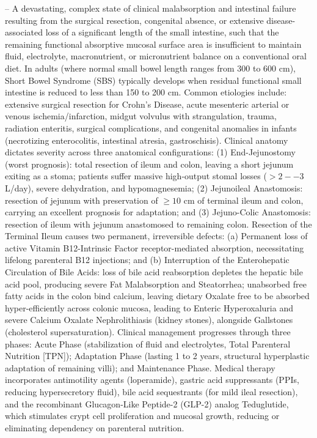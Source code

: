 -- A devastating, complex state of clinical malabsorption and intestinal failure resulting from the surgical resection, congenital absence, or extensive disease-associated loss of a significant length of the small intestine, such that the remaining functional absorptive mucosal surface area is insufficient to maintain fluid, electrolyte, macronutrient, or micronutrient balance on a conventional oral diet. In adults (where normal small bowel length ranges from 300 to 600 cm), Short Bowel Syndrome (SBS) typically develops when residual functional small intestine is reduced to less than 150 to 200 cm. Common etiologies include: extensive surgical resection for Crohn's Disease, acute mesenteric arterial or venous ischemia/infarction, midgut volvulus with strangulation, trauma, radiation enteritis, surgical complications, and congenital anomalies in infants (necrotizing enterocolitis, intestinal atresia, gastroschisis). Clinical anatomy dictates severity across three anatomical configurations: (1) End-Jejunostomy (worst prognosis): total resection of ileum and colon, leaving a short jejunum exiting as a stoma; patients suffer massive high-output stomal losses ($>2--3$ L/day), severe dehydration, and hypomagnesemia; (2) Jejunoileal Anastomosis: resection of jejunum with preservation of $\ge 10$ cm of terminal ileum and colon, carrying an excellent prognosis for adaptation; and (3) Jejuno-Colic Anastomosis: resection of ileum with jejunum anastomosed to remaining colon. Resection of the Terminal Ileum causes two permanent, irreversible defects: (a) Permanent loss of active Vitamin B12-Intrinsic Factor receptor-mediated absorption, necessitating lifelong parenteral B12 injections; and (b) Interruption of the Enterohepatic Circulation of Bile Acids: loss of bile acid reabsorption depletes the hepatic bile acid pool, producing severe Fat Malabsorption and Steatorrhea; unabsorbed free fatty acids in the colon bind calcium, leaving dietary Oxalate free to be absorbed hyper-efficiently across colonic mucosa, leading to Enteric Hyperoxaluria and severe Calcium Oxalate Nephrolithiasis (kidney stones), alongside Gallstones (cholesterol supersaturation). Clinical management progresses through three phases: Acute Phase (stabilization of fluid and electrolytes, Total Parenteral Nutrition [TPN]); Adaptation Phase (lasting 1 to 2 years, structural hyperplastic adaptation of remaining villi); and Maintenance Phase. Medical therapy incorporates antimotility agents (loperamide), gastric acid suppressants (PPIs, reducing hypersecretory fluid), bile acid sequestrants (for mild ileal resection), and the recombinant Glucagon-Like Peptide-2 (GLP-2) analog Teduglutide, which stimulates crypt cell proliferation and mucosal growth, reducing or eliminating dependency on parenteral nutrition.

